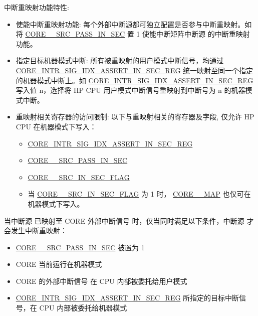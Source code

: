 \documentclass[main\_\_CN.tex]{subfiles}
\begin{document}
中断重映射功能特性:
\begin{itemize}
    \item 使能中断重映射功能: 每个外部中断源都可独立配置是否参与中断重映射。如将 \hyperref[fielddesc:CORE0SOURCESRCPASSINSEC]{CORE\_\_SRC\_PASS\_IN\_SEC} 置 1 使能中断矩阵中断源  的中断重映射功能。
    \item 指定目标机器模式中断: 所有被重映射的用户模式中断信号，均通过 \hyperref[regdesc:CORE0INTRSIGIDXASSERTINSECREG]{CORE\_INTR\_SIG\_IDX\_ASSERT\_IN\_SEC\_REG} 统一映射至同一个指定的机器模式中断上。如 \hyperref[regdesc:CORE0INTRSIGIDXASSERTINSECREG]{CORE\_INTR\_SIG\_IDX\_ASSERT\_IN\_SEC\_REG} 写入值 n，选择将 HP CPU 用户模式中断信号重映射到中断号为 n 的机器模式中断。
    \item 重映射相关寄存器的访问限制: 以下与重映射相关的寄存器及字段, 仅允许 HP CPU 在机器模式下写入：
  \begin{itemize}
    \item \hyperref[regdesc:CORE0INTRSIGIDXASSERTINSECREG]{CORE\_INTR\_SIG\_IDX\_ASSERT\_IN\_SEC\_REG}
    \item \hyperref[fielddesc:CORE0SOURCESRCPASSINSEC]{CORE\_\_SRC\_PASS\_IN\_SEC}
    \item \hyperref[fielddesc:CORE0SOURCESRCINSECFLAG]{CORE\_\_SRC\_IN\_SEC\_FLAG}
    \item 当 \hyperref[fielddesc:CORE0SOURCESRCINSECFLAG]{CORE\_\_SRC\_IN\_SEC\_FLAG} 为 1 时，
          \hyperref[fielddesc:CORE0SOURCEMAP]{CORE\_\_MAP} 也仅可在机器模式下写入。
  \end{itemize}
\end{itemize}

当中断源  已映射至 CORE 外部中断信号  时，仅当同时满足以下条件，中断源  才会发生中断重映射：
\begin{itemize}
  \item \hyperref[fielddesc:CORE0SOURCESRCPASSINSEC]{CORE\_\_SRC\_PASS\_IN\_SEC} 被置为 1
  \item CORE 当前运行在机器模式
  \item CORE 的外部中断信号  在 CPU 内部被委托给用户模式
  \item \hyperref[regdesc:CORE0INTRSIGIDXASSERTINSECREG]{CORE\_INTR\_SIG\_IDX\_ASSERT\_IN\_SEC\_REG} 所指定的目标中断信号，在 CPU 内部被委托给机器模式
\end{itemize}
\end{document}
